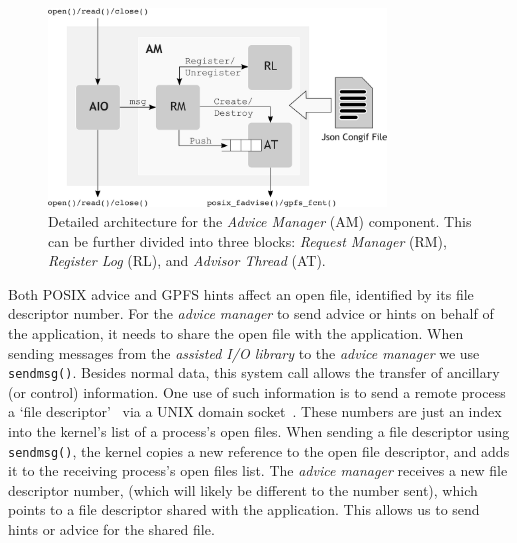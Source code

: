 \begin{figure}[!htb]
  \centering
  \includegraphics[width=0.8\textwidth]{figures/mercury-architecture}
  \caption{Detailed architecture for the \textit{Advice Manager} (AM) component. This can be further divided into three blocks: \textit{Request Manager} (RM), \textit{Register Log} (RL), and \textit{Advisor Thread} (AT).}
  \label{figure: architecture}
\end{figure}

Both POSIX advice and GPFS hints affect an open file, identified by its file descriptor number. For the \textit{advice manager} to send advice or hints on behalf of the application, it needs to share the open file with the application. When sending 
messages from the \textit{assisted I/O library} to the \textit{advice manager} we use \texttt{sendmsg()}. Besides normal data, this system call allows the transfer of ancillary (or control) information. One use of such information is to send a remote 
process a `file descriptor'~\cite{StevensR13} via a UNIX domain socket~\cite{UnixSock}. These numbers are just an index into the kernel's list of a process's open files. When sending a file descriptor using \texttt{sendmsg()}, the kernel copies a new 
reference to the open file descriptor, and adds it to the receiving process's open files list. The \textit{advice manager} receives a new file descriptor number, (which will likely be different to the number sent), which points to a file descriptor 
shared with the application. This allows us to send hints or advice for the shared file.


